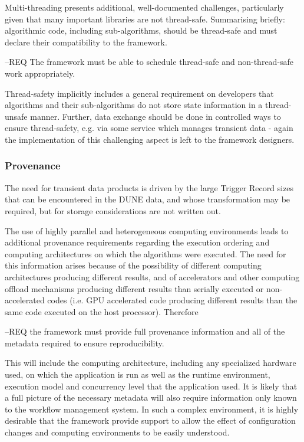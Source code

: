 \documentclass[../main-v1.tex]{subfiles}
\begin{document}
Multi-threading presents additional, well-documented challenges, particularly given that many important libraries are not thread-safe.  Summarising briefly: algorithmic code, including sub-algorithms, should be thread-safe and must declare their compatibility to the framework.

--REQ The framework must be able to schedule thread-safe and non-thread-safe work appropriately.  

Thread-safety implicitly includes a general requirement on developers that algorithms and their sub-algorithms do not store state information in a thread-unsafe manner.  Further, data exchange should be done in controlled ways to ensure thread-safety, e.g. via some service which manages transient data - again the implementation of this challenging aspect is left to the framework designers.


\subsubsection{Provenance} %


The need for transient data products is driven by the large Trigger Record sizes that can be encountered in the DUNE data, and whose transformation may be required, but for storage considerations are not written out.

The use of highly parallel and heterogeneous computing environments leads to additional provenance requirements regarding the execution ordering and computing architectures on which the algorithms were executed.  The need for this information arises because of the possibility of different computing architectures producing different results, and of accelerators and other computing offload mechanisms producing different results than serially executed or non-accelerated codes (i.e. GPU accelerated code producing different results than the same code executed on the host processor).  Therefore 

--REQ the framework must provide full provenance information and all of the metadata required to ensure reproducibility.  

This will include the computing architecture, including any specialized hardware used, on which the application is run as well as the runtime environment, execution model and concurrency level that the application used.  It is likely that a full picture of the necessary metadata will also require information only known to the workflow management system.  In such a complex environment, it is highly desirable that the framework provide support to allow the effect of configuration changes and computing environments to be easily understood.
\end{document}
